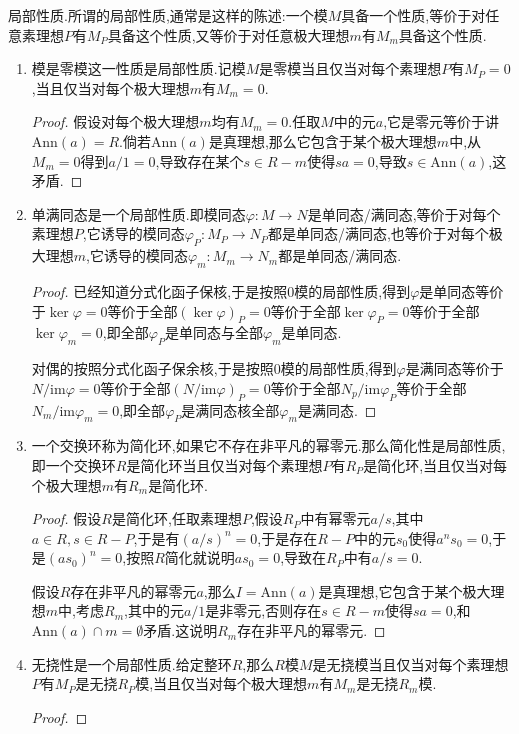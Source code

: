 局部性质.所谓的局部性质,通常是这样的陈述:一个模$M$具备一个性质,等价于对任意素理想$P$有$M_P$具备这个性质,又等价于对任意极大理想$m$有$M_m$具备这个性质.
\begin{enumerate}
	\item 模是零模这一性质是局部性质.记模$M$是零模当且仅当对每个素理想$P$有$M_P=0$,当且仅当对每个极大理想$m$有$M_m=0$.
	\begin{proof}
		
		假设对每个极大理想$m$均有$M_m=0$.任取$M$中的元$a$,它是零元等价于讲$\mathrm{Ann}(a)=R$.倘若$\mathrm{Ann}(a)$是真理想,那么它包含于某个极大理想$m$中,从$M_m=0$得到$a/1=0$,导致存在某个$s\in R-m$使得$sa=0$,导致$s\in\mathrm{Ann}(a)$,这矛盾.
	\end{proof}
	\item 单满同态是一个局部性质.即模同态$\varphi:M\to N$是单同态/满同态,等价于对每个素理想$P$,它诱导的模同态$\varphi_P:M_P\to N_P$都是单同态/满同态,也等价于对每个极大理想$m$,它诱导的模同态$\varphi_m:M_m\to N_m$都是单同态/满同态.
	\begin{proof}
		
		已经知道分式化函子保核,于是按照0模的局部性质,得到$\varphi$是单同态等价于$\ker\varphi=0$等价于全部$(\ker\varphi)_P=0$等价于全部$\ker\varphi_P=0$等价于全部$\ker\varphi_m=0$,即全部$\varphi_P$是单同态与全部$\varphi_m$是单同态.
		
		对偶的按照分式化函子保余核,于是按照0模的局部性质,得到$\varphi$是满同态等价于$N/\mathrm{im}\varphi=0$等价于全部$(N/\mathrm{im}\varphi)_P=0$等价于全部$N_p/\mathrm{im}\varphi_P$等价于全部$N_m/\mathrm{im}\varphi_m=0$,即全部$\varphi_P$是满同态核全部$\varphi_m$是满同态.
	\end{proof}
    \item 一个交换环称为简化环,如果它不存在非平凡的幂零元.那么简化性是局部性质,即一个交换环$R$是简化环当且仅当对每个素理想$P$有$R_P$是简化环,当且仅当对每个极大理想$m$有$R_m$是简化环.
    \begin{proof}
    	
    	假设$R$是简化环,任取素理想$P$,假设$R_P$中有幂零元$a/s$,其中$a\in R,s\in R-P$,于是有$(a/s)^n=0$,于是存在$R-P$中的元$s_0$使得$a^ns_0=0$,于是$(as_0)^n=0$,按照$R$简化就说明$as_0=0$,导致在$R_P$中有$a/s=0$.
    	
    	假设$R$存在非平凡的幂零元$a$,那么$I=\mathrm{Ann}(a)$是真理想,它包含于某个极大理想$m$中,考虑$R_m$,其中的元$a/1$是非零元,否则存在$s\in R-m$使得$sa=0$,和$\mathrm{Ann}(a)\cap m=\emptyset$矛盾.这说明$R_m$存在非平凡的幂零元.
    \end{proof}
    \item 无挠性是一个局部性质.给定整环$R$,那么$R$模$M$是无挠模当且仅当对每个素理想$P$有$M_P$是无挠$R_P$模,当且仅当对每个极大理想$m$有$M_m$是无挠$R_m$模.
    \begin{proof}
    	

\end{proof}
\end{enumerate}
